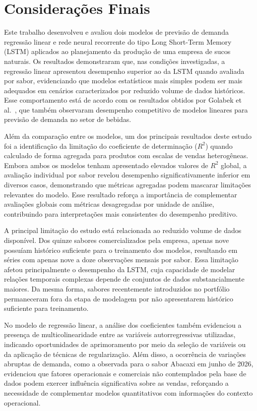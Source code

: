 \section{Considerações Finais}
\label{sec-consideracoes}

Este trabalho desenvolveu e avaliou dois modelos de previsão de demanda  regressão linear e rede neural recorrente do tipo Long Short-Term Memory (LSTM)  aplicados ao planejamento da produção de uma empresa de sucos naturais. Os resultados demonstraram que, nas condições investigadas, a regressão linear apresentou desempenho superior ao da LSTM quando avaliada por sabor, evidenciando que modelos estatísticos mais simples podem ser mais adequados em cenários caracterizados por reduzido volume de dados históricos. Esse comportamento está de acordo com os resultados obtidos por Golabek et al.~\cite{golabek2020demand}, que também observaram desempenho competitivo de modelos lineares para previsão de demanda no setor de bebidas.

Além da comparação entre os modelos, um dos principais resultados deste estudo foi a identificação da limitação do coeficiente de determinação ($R^2$) quando calculado de forma agregada para produtos com escalas de vendas heterogêneas. Embora ambos os modelos tenham apresentado elevados valores de $R^2$ global, a avaliação individual por sabor revelou desempenho significativamente inferior em diversos casos, demonstrando que métricas agregadas podem mascarar limitações relevantes do modelo. Esse resultado reforça a importância de complementar avaliações globais com métricas desagregadas por unidade de análise, contribuindo para interpretações mais consistentes do desempenho preditivo.

A principal limitação do estudo está relacionada ao reduzido volume de dados disponível. Dos quinze sabores comercializados pela empresa, apenas nove possuíam histórico suficiente para o treinamento dos modelos, resultando em séries com apenas nove a doze observações mensais por sabor. Essa limitação afetou principalmente o desempenho da LSTM, cuja capacidade de modelar relações temporais complexas depende de conjuntos de dados substancialmente maiores. Da mesma forma, sabores recentemente introduzidos no portfólio permaneceram fora da etapa de modelagem por não apresentarem histórico suficiente para treinamento.

No modelo de regressão linear, a análise dos coeficientes também evidenciou a presença de multicolinearidade entre as variáveis autorregressivas utilizadas, indicando oportunidades de aprimoramento por meio da seleção de variáveis ou da aplicação de técnicas de regularização. Além disso, a ocorrência de variações abruptas de demanda, como a observada para o sabor Abacaxi em junho de 2026, evidenciou que fatores operacionais e comerciais não contemplados pela base de dados podem exercer influência significativa sobre as vendas, reforçando a necessidade de complementar modelos quantitativos com informações do contexto operacional. 

